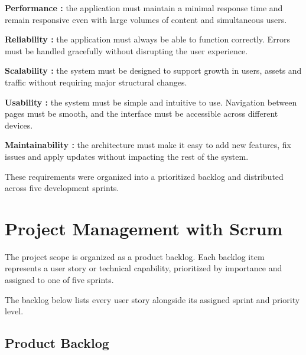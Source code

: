 \textbf{Performance :} the application must maintain a minimal response time and remain responsive even with large volumes of content and simultaneous users.

\textbf{Reliability :} the application must always be able to function correctly. Errors must be handled gracefully without disrupting the user experience.

\textbf{Scalability :} the system must be designed to support growth in users, assets and traffic without requiring major structural changes.

\textbf{Usability :} the system must be simple and intuitive to use. Navigation between pages must be smooth, and the interface must be accessible across different devices.

\textbf{Maintainability :} the architecture must make it easy to add new features, fix issues and apply updates without impacting the rest of the system.

These requirements were organized into a prioritized backlog and distributed across five development sprints.

\section{Project Management with Scrum}

The project scope is organized as a product backlog. Each backlog item represents a user story or technical capability, prioritized by importance and assigned to one of five sprints.

The backlog below lists every user story alongside its assigned sprint and priority level.

\subsection{Product Backlog}

